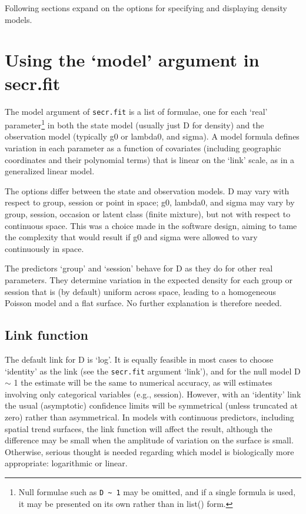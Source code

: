 \documentclass[
]{book}
\begin{document}
Following sections expand on the options for specifying and displaying density models.

\section{Using the `model' argument in secr.fit}\label{using-the-model-argument-in-secr.fit}

The model argument of \texttt{secr.fit} is a list of formulae, one for each `real' parameter\footnote{Null formulae such as \texttt{D\ \textasciitilde{}\ 1} may be omitted, and if a single formula is used, it may be presented on its own rather than in list() form.} in both the state model (usually just D for density) and the observation model (typically g0 or lambda0, and sigma). A model formula defines variation in each parameter as a function of covariates (including geographic coordinates and their polynomial terms) that is linear on the `link' scale, as in a generalized linear model.

The options differ between the state and observation models. D may vary with respect to group, session or point in space; g0, lambda0, and sigma may vary by group, session, occasion or latent class (finite mixture), but not with respect to continuous space. This was a choice made in the software design, aiming to tame the complexity that would result if g0 and sigma were allowed to vary continuously in space.

The predictors `group' and `session' behave for D as they do for other real parameters. They determine variation in the expected density for each group or session that is (by default) uniform across space, leading to a homogeneous Poisson model and a flat surface. No further explanation is therefore needed.

\subsection{Link function}\label{link-function}


The default link for D is `log'. It is equally feasible in most cases to choose `identity' as the link (see the \texttt{secr.fit} argument `link'), and for the null model D \(\sim\) 1 the estimate will be the same to numerical accuracy, as will estimates involving only categorical variables (e.g., session). However, with an `identity' link the usual (asymptotic) confidence limits will be symmetrical (unless truncated at zero) rather than asymmetrical. In models with continuous predictors, including spatial trend surfaces, the link function will affect the result, although the difference may be small when the amplitude of variation on the surface is small. Otherwise, serious thought is needed regarding which model is biologically more appropriate: logarithmic or linear.
\end{document}
